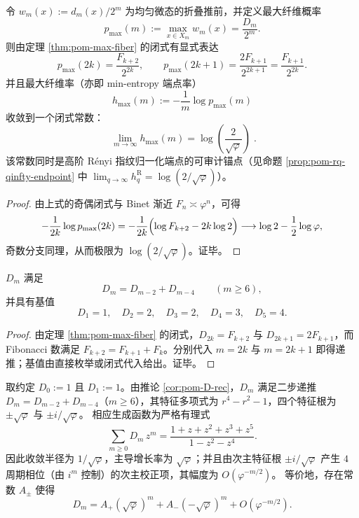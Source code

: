 \begin{corollary}[最大纤维概率端点与可审计极限常数]\label{cor:pom-max-fiber-rate-endpoint}
令 \(w_m(x):=d_m(x)/2^m\) 为均匀微态的折叠推前，并定义最大纤维概率
\[
p_{\max}(m):=\max_{x\in X_m}w_m(x)=\frac{D_m}{2^m}.
\]
则由定理 \ref{thm:pom-max-fiber} 的闭式有显式表达
\[
p_{\max}(2k)=\frac{F_{k+2}}{2^{2k}},
\qquad
p_{\max}(2k+1)=\frac{2F_{k+1}}{2^{2k+1}}=\frac{F_{k+1}}{2^{2k}}.
\]
并且最大纤维率（亦即 min-entropy 端点率）
\[
h_{\max}(m):=-\frac{1}{m}\log p_{\max}(m)
\]
收敛到一个闭式常数：
\[
\boxed{\;
\lim_{m\to\infty}h_{\max}(m)=\log\!\left(\frac{2}{\sqrt{\varphi}}\right)\; }.
\]
该常数同时是高阶 Rényi 指纹归一化端点的可审计锚点（见命题 \ref{prop:pom-rq-qinfty-endpoint} 中 \(\lim_{q\to\infty}h_q^{\mathrm R}=\log(2/\sqrt{\varphi})\)）。
\end{corollary}
\begin{proof}
由上式的奇偶闭式与 Binet 渐近 \(F_n\asymp \varphi^n\)，可得
\[
-\frac{1}{2k}\log p_{\max}(2k)
=-\frac{1}{2k}\Bigl(\log F_{k+2}-2k\log 2\Bigr)
\longrightarrow \log 2-\frac12\log\varphi,
\]
奇数分支同理，从而极限为 \(\log(2/\sqrt{\varphi})\)。证毕。
\end{proof}

\begin{corollary}[二步递推与基值]\label{cor:pom-D-rec}
$D_m$ 满足
\[
D_m=D_{m-2}+D_{m-4}\qquad(m\ge 6),
\]
并具有基值
\[
D_1=1,\quad D_2=2,\quad D_3=2,\quad D_4=3,\quad D_5=4.
\]
\end{corollary}
\begin{proof}
由定理 \ref{thm:pom-max-fiber} 的闭式，$D_{2k}=F_{k+2}$ 与 $D_{2k+1}=2F_{k+1}$，而 Fibonacci 数满足 $F_{k+2}=F_{k+1}+F_k$。分别代入 $m=2k$ 与 $m=2k+1$ 即得递推；基值由直接枚举或闭式代入给出。证毕。
\end{proof}

\begin{remark}[最大纤维序列的生成函数与四周期次主振荡]\label{rem:pom-D-generating-function}
取约定 \(D_0:=1\) 且 \(D_1:=1\)。由推论 \ref{cor:pom-D-rec}，\(D_m\) 满足二步递推 \(D_m=D_{m-2}+D_{m-4}\)（\(m\ge 6\)），其特征多项式为 \(r^{4}-r^{2}-1\)，四个特征根为 \(\pm\sqrt{\varphi}\) 与 \(\pm i/\sqrt{\varphi}\)。
相应生成函数为严格有理式
\[
\sum_{m\ge 0} D_m\,z^m=\frac{1+z+z^{2}+z^{3}+z^{5}}{1-z^{2}-z^{4}}.
\]
因此收敛半径为 \(1/\sqrt{\varphi}\)，主导增长率为 \(\sqrt{\varphi}\)；并且由次主特征根 \(\pm i/\sqrt{\varphi}\) 产生 \(4\) 周期相位（由 \(i^m\) 控制）的次主校正项，其幅度为 \(O(\varphi^{-m/2})\)。
等价地，存在常数 \(A_\pm\) 使得
\[
D_m=A_+(\sqrt{\varphi})^{m}+A_-(-\sqrt{\varphi})^{m}+O(\varphi^{-m/2}).
\]
\end{remark}

